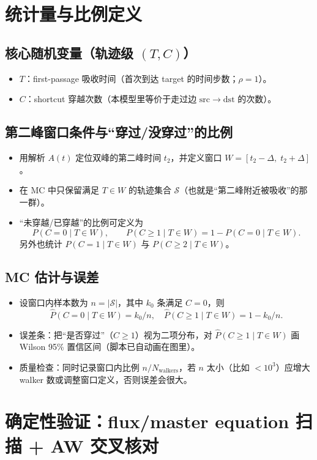 \documentclass[11pt,fontset=fandol]{ctexart}
\begin{document}
\section{统计量与比例定义}
\subsection{核心随机变量（轨迹级 $(T,C)$）}
\begin{itemize}
  \item $T$：first-passage 吸收时间（首次到达 target 的时间步数；$\rho=1$）。
  \item $C$：shortcut 穿越次数（本模型里等价于走过边 $\mathrm{src}\to\mathrm{dst}$ 的次数）。
\end{itemize}

\subsection{第二峰窗口条件与“穿过/没穿过”的比例}
\begin{itemize}
  \item 用解析 $A(t)$ 定位双峰的第二峰时间 $t_2$，并定义窗口 $W=[t_2-\Delta,\;t_2+\Delta]$。
  \item 在 MC 中只保留满足 $T\in W$ 的轨迹集合 $\mathcal{S}$（也就是“第二峰附近被吸收”的那一群）。
  \item “未穿越/已穿越”的比例可定义为
  \[
    P(C=0\mid T\in W),\qquad P(C\ge 1\mid T\in W)=1-P(C=0\mid T\in W).
  \]
  另外也统计 $P(C=1\mid T\in W)$ 与 $P(C\ge2\mid T\in W)$。
\end{itemize}

\subsection{MC 估计与误差}
\begin{itemize}
  \item 设窗口内样本数为 $n=|\mathcal{S}|$，其中 $k_0$ 条满足 $C=0$，则
  \[
    \widehat{P}(C=0\mid T\in W)=k_0/n,\quad \widehat{P}(C\ge1\mid T\in W)=1-k_0/n.
  \]
  \item 误差条：把“是否穿过”（$C\ge1$）视为二项分布，对 $\widehat{P}(C\ge1\mid T\in W)$ 画 Wilson 95\% 置信区间（脚本已自动画在图里）。
  \item 质量检查：同时记录窗口内比例 $n/N_{\mathrm{walkers}}$，若 $n$ 太小（比如 $<10^3$）应增大 walker 数或调整窗口定义，否则误差会很大。
\end{itemize}

\section{确定性验证：flux/master equation 扫描 + AW 交叉核对}

\end{document}
